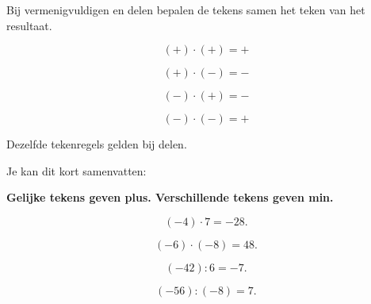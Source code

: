 \documentclass{ximera}
\begin{document}


Bij vermenigvuldigen en delen bepalen de tekens samen het teken van het
resultaat.

\[
(+)\cdot(+)=+
\]

\[
(+)\cdot(-)=-
\]

\[
(-)\cdot(+) = -
\]

\[
(-)\cdot(-)=+
\]

Dezelfde tekenregels gelden bij delen.

Je kan dit kort samenvatten:

\begin{center}
\textbf{Gelijke tekens geven plus. Verschillende tekens geven min.}
\end{center}


\begin{voorbeeld}

\[
(-4)\cdot7=-28.
\]

\end{voorbeeld}


\begin{voorbeeld}

\[
(-6)\cdot(-8)=48.
\]

\end{voorbeeld}


\begin{voorbeeld}

\[
(-42):6=-7.
\]

\end{voorbeeld}


\begin{voorbeeld}

\[
(-56):(-8)=7.
\]

\end{voorbeeld}
\end{document}
